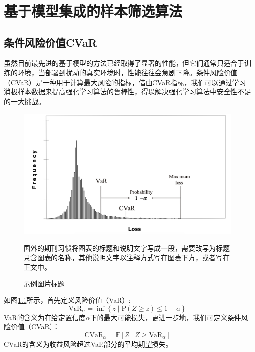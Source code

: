 
\chapter{基于模型集成的样本筛选算法}

\section{条件风险价值CVaR}

虽然目前最先进的基于模型的方法已经取得了显著的性能，但它们通常只适合于训练的环境，当部署到扰动的真实环境时，性能往往会急剧下降。条件风险价值（CVaR）是一种用于计算最大风险的指标，借由CVaR指标，我们可以通过学习消极样本数据来提高强化学习算法的鲁棒性，得以解决强化学习算法中安全性不足的一大挑战。

\begin{figure}
  \centering
  \includegraphics[width=\linewidth]{figures/CVaR.png}
  \caption*{国外的期刊习惯将图表的标题和说明文字写成一段，需要改写为标题只含图表的名称，其他说明文字以注释方式写在图表下方，或者写在正文中。}
  \caption{示例图片标题}
  \label{fig:cvar}
\end{figure}

如图\ref{fig:cvar}所示，首先定义风险价值（VaR）:
\begin{equation}
    \mathrm{VaR}_\alpha=\inf\left\{z\mid\mathrm{P}(Z\geq z)\leq 1-\alpha\right\}
\end{equation}
VaR的含义为在给定置信度$\alpha$下的最大可能损失，更进一步地，我们可定义条件风险价值（CVaR）：
\begin{equation}
    \mathrm{CVaR}_\alpha = \mathbb{E}\left[Z\mid Z\geq \mathrm{VaR}_\alpha\right]
\end{equation}
CVaR的含义为收益风险超过VaR部分的平均期望损失。

